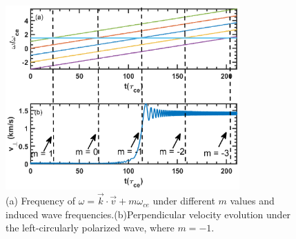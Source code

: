 \documentclass{cpbtex3}
\begin{document}
\begin{figure}[htbp]
\centering
\includegraphics[width=0.8\textwidth]{Figure7.eps}%
\caption{\label{fig:7}(a) Frequency of $\omega = \vec{k} \cdot \vec{v} + m\omega_{ce}$ under different $m$ values and induced wave frequencies.(b)Perpendicular velocity evolution under the left-circularly polarized wave, where $m = -1$.}
\end{figure}
\end{document}
